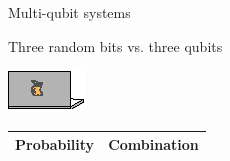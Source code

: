 \documentclass[10pt]{beamer}
\begin{document}
{\begin{frame}[fragile]{Multi-qubit systems}
\begin{equation}
\end{equation}


\end{frame}
}

{
\begin{frame}[fragile]{Three random bits vs. three qubits}

\begin{minipage}[c]{0.49\textwidth}
\centering
\includegraphics[scale=1.9]{Vectors/laptop_c.eps}\\
\vspace{0.4cm}
\begin{tabular}{c | c}
	Probability & Combination \\
	\midrule

\end{tabular}
\end{minipage}
\end{frame}}
\end{document}
